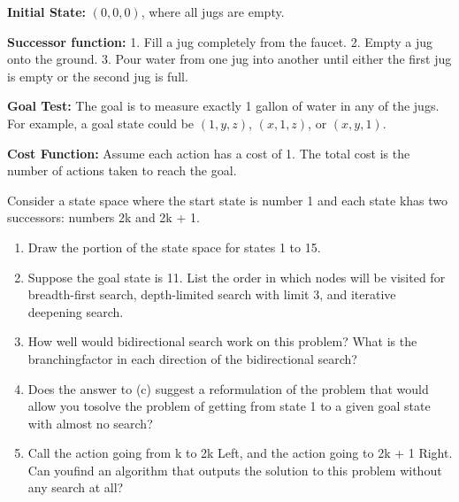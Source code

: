 \documentclass[cn,12pt]{homework}
\begin{document}
\begin{solution}
  \textbf{Initial State:}  
  \((0, 0, 0)\), where all jugs are empty.

  \textbf{Successor function:}  
  1. Fill a jug completely from the faucet.  
  2. Empty a jug onto the ground.  
  3. Pour water from one jug into another until either the first jug is empty or the second jug is full.

  \textbf{Goal Test:}  
  The goal is to measure exactly 1 gallon of water in any of the jugs. For example, a goal state could be \((1, y, z)\), \((x, 1, z)\), or \((x, y, 1)\).

  \textbf{Cost Function:}  
  Assume each action has a cost of 1. The total cost is the number of actions taken to reach the goal.

\end{solution}
\newpage
\begin{problem}

{\selectfont Consider a state space where the start state is number 1 and each state khas two successors: numbers 2k and 2k + 1.}

\begin{enumerate}[label=\alph*)]
    \item Draw the portion of the state space for states 1 to 15.
    \item Suppose the goal state is 11. List the order in which nodes will be visited for breadth-first search, depth-limited search with limit 3, and iterative deepening search.
    \item How well would bidirectional search work on this problem? What is the branchingfactor in each direction of the bidirectional search?
    \item Does the answer to (c) suggest a reformulation of the problem that would allow you tosolve the problem of getting from state 1 to a given goal state with almost no search?
    \item Call the action going from k to 2k Left, and the action going to 2k + 1 Right. Can youfind an algorithm that outputs the solution to this problem without any search at all?
\end{enumerate}

\end{problem}
\end{document}
